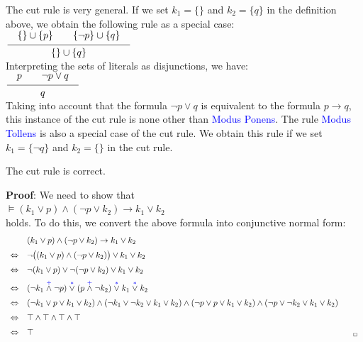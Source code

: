 The cut rule is very general. If we set $k_1 = \{\}$ and $k_2 = \{q\}$ in the definition above,
we obtain the following rule as a special case: \\[0.2cm]
\hspace*{1.3cm} $\schluss{\{\} \cup \{p\} \quad\quad \{\neg p\} \cup \{ q \} }{ \{\} \cup \{q\} }$ \\[0.2cm]
Interpreting the sets of literals as disjunctions, we have: \\[0.2cm]
\hspace*{1.3cm}  $\schluss{p \quad\quad \neg p \vee q }{ q }$ \\[0.2cm]
Taking into account that the formula $\neg p \vee q$ is equivalent to the
formula $p \rightarrow q$, this instance of the cut rule is none other than \textcolor{blue}{Modus Ponens}.
The rule \textcolor{blue}{Modus Tollens} is also a special case of the cut rule. We
obtain this rule if we set $k_1 = \{ \neg q \}$ and $k_2 = \{\}$ in the cut rule.

\begin{Theorem}
  The cut rule is correct.
\end{Theorem}
\textbf{Proof}: We need to show that
\\[0.2cm]
\hspace*{1.3cm}
$\models (k_1 \vee p) \wedge (\neg p \vee k_2) \rightarrow k_1 \vee k_2$
\\[0.2cm]
holds. To do this, we convert the above formula into conjunctive normal form:
$$
\begin{array}{ll}
  & (k_1 \vee p) \wedge (\neg p \vee k_2) \rightarrow k_1 \vee k_2  \\[0.2cm]
\Leftrightarrow  & 
    \neg \bigl( (k_1 \vee p) \wedge (\neg p \vee k_2) \bigr) \vee k_1 \vee k_2 \\[0.2cm]
\Leftrightarrow  & 
    \neg (k_1 \vee p) \vee \neg (\neg p \vee k_2) \vee k_1 \vee k_2 \\[0.2cm]
\Leftrightarrow  & 
     (\neg k_1 \stackrel{\blue{+}}{\wedge} \neg p) \stackrel{\blue{*}}{\vee}  (p \stackrel{\blue{+}}{\wedge} \neg k_2) \stackrel{\blue{*}}{\vee} k_1 \stackrel{\blue{*}}{\vee} k_2 \\[0.2cm]
\Leftrightarrow  & 
     (\neg k_1 \vee p \vee k_1 \vee k_2)  \wedge 
     (\neg k_1 \vee \neg k_2 \vee k_1 \vee k_2)  \wedge 
     (\neg p \vee p \vee k_1 \vee k_2)  \wedge 
     (\neg p \vee \neg k_2 \vee k_1 \vee k_2) 
      \\[0.2cm]
\Leftrightarrow  & 
     \verum  \wedge 
     \verum  \wedge 
     \verum  \wedge 
     \verum 
      \\[0.2cm]
\Leftrightarrow  & 
     \verum    \hspace*{13.5cm} _\Box
      \\
\end{array}
$$


